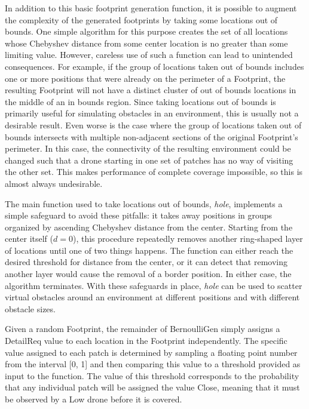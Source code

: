 In addition to this basic footprint generation function, it is possible to augment the complexity of the generated footprints by taking some locations out of bounds. One simple algorithm for this purpose creates the set of all locations whose Chebyshev distance from some center location is no greater than some limiting value. However, careless use of such a function can lead to unintended consequences. For example, if the group of locations taken out of bounds includes one or more positions that were already on the perimeter of a Footprint, the resulting Footprint will not have a distinct cluster of out of bounds locations in the middle of an in bounds region. Since taking locations out of bounds is primarily useful for simulating obstacles in an environment, this is usually not a desirable result. Even worse is the case where the group of locations taken out of bounds intersects with multiple non-adjacent sections of the original Footprint's perimeter. In this case, the connectivity of the resulting environment could be changed such that a drone starting in one set of patches has no way of visiting the other set. This makes performance of complete coverage impossible, so this is almost always undesirable.

The main function used to take locations out of bounds, \textit{hole}, implements a simple safeguard to avoid these pitfalls: it takes away positions in groups organized by ascending Chebyshev distance from the center. Starting from the center itself ($d = 0$), this procedure repeatedly removes another ring-shaped layer of locations until one of two things happens. The function can either reach the desired threshold for distance from the center, or it can detect that removing another layer would cause the removal of a border position. In either case, the algorithm terminates. With these safeguards in place, \textit{hole} can be used to scatter virtual obstacles around an environment at different positions and with different obstacle sizes. 

Given a random Footprint, the remainder of BernoulliGen simply assigns a DetailReq value to each location in the Footprint independently. The specific value assigned to each patch is determined by sampling a floating point number from the interval [0, 1] and then comparing this value to a threshold provided as input to the function. The value of this threshold corresponds to the probability that any individual patch will be assigned the value Close, meaning that it must be observed by a Low drone before it is covered.

